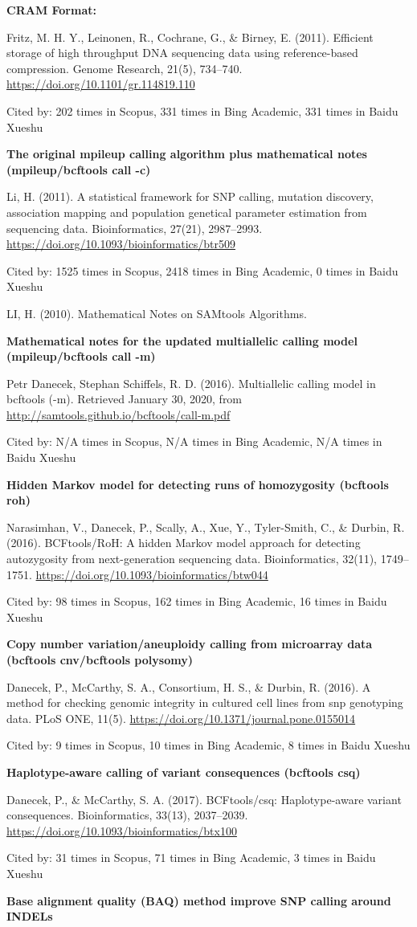 \documentclass[]{article}
\newcommand{\cb}[3]{\par Cited by: {\color{blue}\Huge #1} times in Scopus, {\color{blue}\Huge #2} times in Bing Academic, {\color{blue}\Huge #3} times in Baidu Xueshu}
\begin{document}
\textbf{CRAM Format:}

Fritz, M. H. Y., Leinonen, R., Cochrane, G., \& Birney, E. (2011). Efficient storage of high throughput DNA sequencing data using reference-based compression. Genome Research, 21(5), 734–740. \url{https://doi.org/10.1101/gr.114819.110}\cb{202}{331}{331}

\textbf{The original mpileup calling algorithm plus mathematical notes (mpileup/bcftools call -c)}

Li, H. (2011). A statistical framework for SNP calling, mutation discovery, association mapping and population genetical parameter estimation from sequencing data. Bioinformatics, 27(21), 2987–2993. \url{https://doi.org/10.1093/bioinformatics/btr509}\cb{1525}{2418}{0}

LI, H. (2010). Mathematical Notes on SAMtools Algorithms.

\textbf{Mathematical notes for the updated multiallelic calling model (mpileup/bcftools call -m)}

Petr Danecek, Stephan Schiffels, R. D. (2016). Multiallelic calling model in bcftools (-m). Retrieved January 30, 2020, from \url{http://samtools.github.io/bcftools/call-m.pdf}\cb{N/A}{N/A}{N/A}

\textbf{Hidden Markov model for detecting runs of homozygosity (bcftools roh)}

Narasimhan, V., Danecek, P., Scally, A., Xue, Y., Tyler-Smith, C., \& Durbin, R. (2016). BCFtools/RoH: A hidden Markov model approach for detecting autozygosity from next-generation sequencing data. Bioinformatics, 32(11), 1749–1751. \url{https://doi.org/10.1093/bioinformatics/btw044} \cb{98}{162}{16}

\textbf{Copy number variation/aneuploidy calling from microarray data (bcftools cnv/bcftools polysomy)}

Danecek, P., McCarthy, S. A., Consortium, H. S., \& Durbin, R. (2016). A method for checking genomic integrity in cultured cell lines from snp genotyping data. PLoS ONE, 11(5). \url{https://doi.org/10.1371/journal.pone.0155014}\cb{9}{10}{8}

\textbf{Haplotype-aware calling of variant consequences (bcftools csq)}

Danecek, P., \& McCarthy, S. A. (2017). BCFtools/csq: Haplotype-aware variant consequences. Bioinformatics, 33(13), 2037–2039. \url{https://doi.org/10.1093/bioinformatics/btx100}\cb{31}{71}{3}

\textbf{Base alignment quality (BAQ) method improve SNP calling around INDELs}
\end{document}
